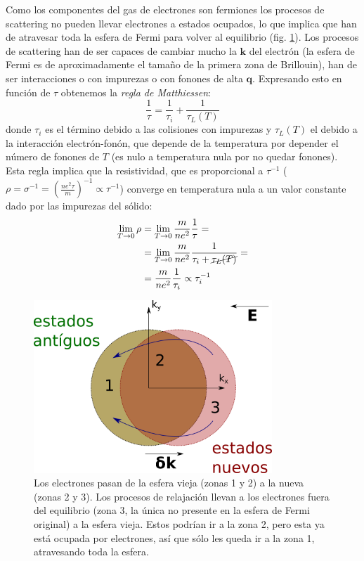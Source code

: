Como los componentes del gas de electrones son fermiones los procesos
de scattering no pueden llevar electrones a estados ocupados, lo que
implica que han de atravesar toda la esfera de Fermi para volver al equilibrio
(fig. \ref{fig:fermiscattering}). Los procesos de scattering han de ser capaces
de cambiar mucho la $\mathbf{k}$ del electrón (la esfera de Fermi es
de aproximadamente el tamaño de la primera zona de Brillouin), han de
ser interacciones o con impurezas o con fonones de alta
$\mathbf{q}$. Expresando esto en función de $\tau$ obtenemos la
\emph{regla de Matthiessen}:
\begin{equation}
  \frac{1}{\tau} = \frac{1}{\tau_i} + \frac{1}{\tau_L (T)}
\end{equation}
donde $\tau_i$ es el término debido a las colisiones con impurezas y
$\tau_L(T)$ el debido a la interacción electrón-fonón, que depende de
la temperatura por depender el número de fonones de $T$ (es nulo a
temperatura nula por no quedar fonones). Esta regla
implica que la resistividad, que es proporcional a $\tau^{-1}$
($\rho = \sigma^{-1} = \left( \frac{ne^2 \tau}{m} \right)^{-1} \propto
\tau^{-1}$) converge en temperatura nula a un valor constante dado por
las impurezas del sólido:
\begin{equation}
\begin{split}
  \lim_{T\to 0} \rho &= \lim_{T\to 0} \frac{m}{ne^2} \frac{1}{\tau} =
  \\ &=
  \lim_{T\to 0} \frac{m}{ne^2} \frac{1}{ \tau_i + \cancel{\tau_L(T)}}= \\ &= \frac{m}{ne^2}
                                          \frac{1}{\tau_i} \propto
                                          \tau_i ^{-1}
\end{split}
\end{equation}

\begin{figure}
  \centering
  \includegraphics[width=0.8\textwidth]{figures/fermiscattering.png}
  \caption{Los electrones pasan de la esfera vieja (zonas 1 y 2) a la
    nueva (zonas 2 y 3). Los procesos de relajación llevan a los
    electrones fuera del equilibrio (zona 3, la única no presente en
    la esfera de Fermi original) a la esfera vieja. Estos podrían ir a
  la zona 2, pero esta ya está ocupada por electrones, así que sólo
  les queda ir a la zona 1, atravesando toda la esfera.}
  \label{fig:fermiscattering}
\end{figure}

